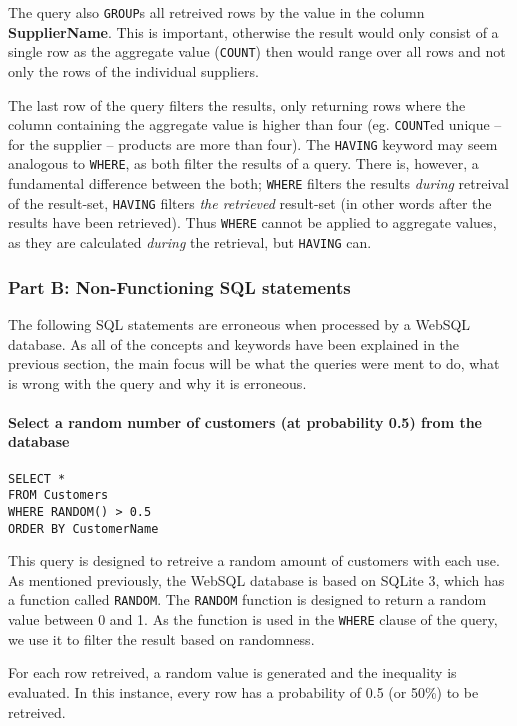 The query also \texttt{GROUP}s all retreived rows by the value in the
column \textbf{SupplierName}. This is important, otherwise the result
would only consist of a single row as the aggregate value (\texttt{COUNT})
then would range over all rows and not only the rows of the individual
suppliers.

The last row of the query filters the results, only returning rows
where the column containing the aggregate value is higher than four
(eg. \texttt{COUNT}ed unique -- for the supplier -- products are more
than four). The \texttt{HAVING} keyword may seem analogous to \texttt{WHERE},
as both filter the results of a query. There is, however, a fundamental
difference between the both; \texttt{WHERE} filters the results \textit{during}
retreival of the result-set, \texttt{HAVING} filters \textit{the retrieved}
result-set (in other words after the results have been retrieved). Thus \texttt{WHERE}
cannot be applied to aggregate values, as they are calculated \textit{during} the
retrieval, but \texttt{HAVING} can.

\subsubsection{Part B: Non-Functioning SQL statements}
The following SQL statements are erroneous when processed by a WebSQL database.
As all of the concepts and keywords have been explained in the previous
section, the main focus will be what the queries were ment to do, what is
wrong with the query and why it is erroneous.

\paragraph{Select a random number of customers (at probability 0.5) from the
  database}

\begin{lstlisting}[label={sqlstatement3}]
SELECT *
FROM Customers
WHERE RANDOM() > 0.5
ORDER BY CustomerName
\end{lstlisting}

This query is designed to retreive a random amount of customers with each
use. As mentioned previously, the WebSQL database is based on SQLite 3,
which has a function called \texttt{RANDOM}. The \texttt{RANDOM} function
is designed to return a random value between 0 and 1. As the function is used
in the \texttt{WHERE} clause of the query, we use it to filter the result
based on randomness.

For each row retreived, a random value is generated and the inequality is
evaluated. In this instance, every row has a probability of 0.5 (or 50\%)
to be retreived.

